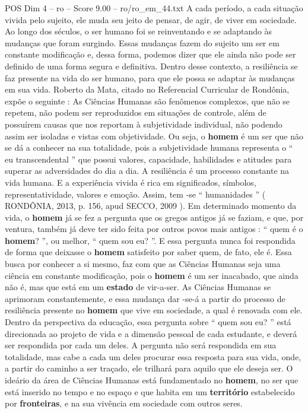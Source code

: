 \begin{textsample}{POS Dim 4 – ro – Score 9.00 – ro/ro\_em\_44.txt}
A cada período, a cada situação vivida pelo sujeito, ele muda seu jeito de pensar, de agir, de viver em sociedade.
Ao longo dos séculos, o ser humano foi se reinventando e se adaptando às mudanças que foram surgindo.
Essas mudanças fazem do sujeito um ser em constante modificação e, dessa forma, podemos dizer que ele ainda não pode ser definido de uma forma segura e definitiva.
Dentro desse contexto, a resiliência se faz presente na vida do ser humano, para que ele possa se adaptar às mudanças em sua vida.
Roberto da Mata, citado no Referencial Curricular de Rondônia, expõe o seguinte : As Ciências Humanas são fenômenos complexos, que não se repetem, não podem ser reproduzidos em situações de controle, além de possuírem causas que nos reportam à subjetividade individual, não podendo assim ser isoladas e vistas com objetividade.
Ou seja, o \textbf{homem} é um ser que não se dá a conhecer na sua totalidade, pois a subjetividade humana representa o “ eu transcendental ” que possui valores, capacidade, habilidades e atitudes para superar as adversidades do dia a dia.
A resiliência é um processo constante na vida humana.
E a experiência vivida é rica em significados, símbolos, representatividade, valores e emoção.
Assim, tem -se “ humanidades ” ( RONDÔNIA, 2013, p. 156, apud SECCO, 2009 ).
Em determinado momento da vida, o \textbf{homem} já se fez a pergunta que os gregos antigos já se faziam, e que, por ventura, também já deve ter sido feita por outros povos mais antigos : “ quem é o \textbf{homem}? ”, ou melhor, “ quem sou eu? ”.
E essa pergunta nunca foi respondida de forma que deixasse o \textbf{homem} satisfeito por saber quem, de fato, ele é.
Essa busca por conhecer a si mesmo, faz com que as Ciências Humanas seja uma ciência em constante modificação, pois o \textbf{homem} é um ser inacabado, que ainda não é, mas que está em um \textbf{estado} de vir-a-ser.
As Ciências Humanas se aprimoram constantemente, e essa mudança dar -se-á a partir do processo de resiliência presente no \textbf{homem} que vive em sociedade, a qual é renovada com ele.
Dentro da perspectiva da educação, essa pergunta sobre “ quem sou eu? ” está direcionada ao projeto de vida e a dimensão pessoal de cada estudante, e deverá ser respondida por cada um deles.
A pergunta não será respondida em sua totalidade, mas cabe a cada um deles procurar essa resposta para sua vida, onde, a partir do caminho a ser traçado, ele trilhará para aquilo que ele deseja ser.
O ideário da área de Ciências Humanas está fundamentado no \textbf{homem}, no ser que está inserido no tempo e no espaço e que habita em um \textbf{território} estabelecido por \textbf{fronteiras}, e na sua vivência em sociedade com outros seres.

\end{textsample}
